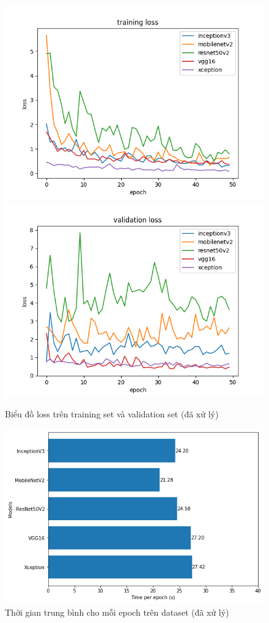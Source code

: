 \documentclass[a4paper,14pt]{extarticle}
\begin{document}
		\begin{figure}[H]
			\centering
			\includegraphics[scale=0.45]{images/loss.png}
			\includegraphics[scale=0.45]{images/val_loss.png}
			\caption{Biểu đồ loss trên training set và validation set (đã xử lý)}
		\end{figure}
		\begin{figure}[H]
			\centering
			\includegraphics[scale=0.5]{images/processed_time}
			\caption{Thời gian trung bình cho mỗi epoch trên dataset (đã xử lý)}
		\end{figure}
		
\end{document}
